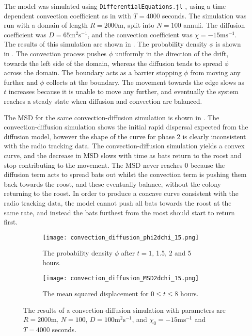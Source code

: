 The model was simulated using \texttt{DifferentialEquations.jl} \cite{DifferentialEquations}, using a time dependent convection coefficient as in  with $T = 4000$ seconds. The
simulation was run with a domain of length $R = 2000$m, split into $N = 100$
annuli. The diffusion coefficient was $D = 65\mathrm{m^2s^{-1}}$, and the convection coefficient
was $\chi =  - 15\mathrm{ms^{-1}}$. The results
of this simulation are shown in . The probability density $\phi$ is shown in . The convection process pushes $\phi$ uniformly in the direction of the drift, towards the left side of the domain, whereas the diffusion tends to spread $\phi$ across the domain. The boundary acts as a barrier stopping $\phi$ from moving any further and $\phi$ collects at the boundary. The movement towards the edge slows as $t$ increases because it is unable to move any further, and eventually the system reaches a steady state when diffusion and convection are balanced.

The MSD for the same convection-diffusion simulation is shown in . The convection-diffusion simulation shows the initial rapid dispersal expected from the diffusion model, however the shape of the curve for phase 2 is clearly inconsistent with the radio tracking data. The convection-diffusion simulation yields a convex curve, and the decrease in MSD slows with time as bats return to the roost and stop contributing to the movement. The MSD never reaches 0 because the diffusion term acts to spread bats out whilst the convection term is pushing them back towards the roost, and these eventually balance, without the colony returning to the roost. In order to produce a concave curve consistent with the radio tracking data, the model cannot push all bats towards the roost at the same rate, and instead the bats furthest from the roost should start to return first.


         \begin{figure}
              \centering
              \begin{subfigure}[b]{0.48\textwidth}
                  \centering
                  \texttt{[image: convection\_diffusion\_phi2dchi\_15.png]}
                  \caption{The probability density $\phi$ after $t = 1$, 1.5, 2 and 5 hours.}
                  \label{fig:convection2dphi}
              \end{subfigure}
              \hfill
              \begin{subfigure}[b]{0.48\textwidth}
                  \centering
                  \texttt{[image: convection\_diffusion\_MSD2dchi\_15.png]}
                  \caption{The mean squared displacement for $0 \leq t \leq 8$ hours. }
                  \label{fig:convection2dmsd}
              \end{subfigure}
              \caption{The results of a convection-diffusion simulation with parameters are $R = 2000$m, $N = 100$,
              $D = 100\mathrm{m^2s^{-1}}$, and $\chi_0 = - 15\mathrm{ms^{-1}}$ and $T = 4000$ seconds.}
              \label{fig:convection2d}
              \end{figure}

